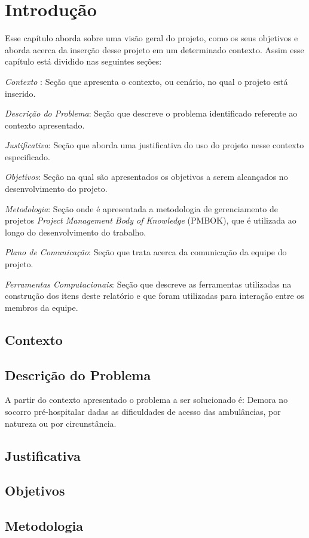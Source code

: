 \chapter[Introdução]{Introdução}\label{cap1}

Esse capítulo aborda sobre uma visão geral do projeto, como os seus objetivos e aborda acerca da inserção desse projeto em um determinado contexto. Assim esse capítulo está dividido nas seguintes seções:

\textit{Contexto} : Seção que apresenta o contexto, ou cenário, no qual o projeto está inserido.

\textit{Descrição do Problema}: Seção que descreve o problema identificado referente ao contexto apresentado.

\textit{Justificativa}: Seção que aborda uma justificativa do uso do projeto nesse contexto especificado.

\textit{Objetivos}: Seção na qual são apresentados os objetivos a serem alcançados no desenvolvimento do projeto.

\textit{Metodologia}: Seção onde é apresentada a metodologia de gerenciamento de projetos \textit{Project Management Body of Knowledge} (PMBOK), que é utilizada ao longo do desenvolvimento do trabalho.

\textit{Plano de Comunicação}: Seção que trata acerca da comunicação da equipe do projeto.

\textit{Ferramentas Computacionais}: Seção que descreve as ferramentas utilizadas na construção dos itens deste relatório e que foram utilizadas para interação entre os membros da equipe.


\section{Contexto}
  
\section{Descrição do Problema}
A partir do contexto apresentado o problema a ser solucionado é:
Demora no socorro pré-hospitalar dadas as dificuldades de acesso das ambulâncias, por natureza ou por circunstância.

\section{Justificativa}
  
\section{Objetivos}
  


\section{Metodologia}
   

